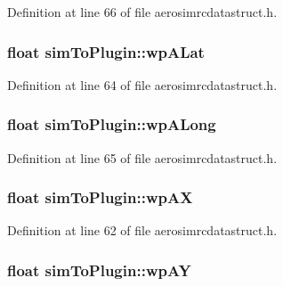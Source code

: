 \-Definition at line 66 of file aerosimrcdatastruct.\-h.

\hypertarget{group___aero_sim_r_c_ga1eb50174e2e2f438f0b1aef4dca0744f}{
\subsubsection[{wp\-A\-Lat}]{\setlength{\rightskip}{0pt plus 5cm}float {\bf sim\-To\-Plugin\-::wp\-A\-Lat}}}\label{group___aero_sim_r_c_ga1eb50174e2e2f438f0b1aef4dca0744f}


\-Definition at line 64 of file aerosimrcdatastruct.\-h.

\hypertarget{group___aero_sim_r_c_gacda15282e441109ecba7a4709e9b8a0c}{
\subsubsection[{wp\-A\-Long}]{\setlength{\rightskip}{0pt plus 5cm}float {\bf sim\-To\-Plugin\-::wp\-A\-Long}}}\label{group___aero_sim_r_c_gacda15282e441109ecba7a4709e9b8a0c}


\-Definition at line 65 of file aerosimrcdatastruct.\-h.

\hypertarget{group___aero_sim_r_c_gaeee88b74290e9df5d3c70d111c9375cc}{
\subsubsection[{wp\-A\-X}]{\setlength{\rightskip}{0pt plus 5cm}float {\bf sim\-To\-Plugin\-::wp\-A\-X}}}\label{group___aero_sim_r_c_gaeee88b74290e9df5d3c70d111c9375cc}


\-Definition at line 62 of file aerosimrcdatastruct.\-h.

\hypertarget{group___aero_sim_r_c_gaf5e140b64d5e9eae533fd3c0195c0fa8}{
\subsubsection[{wp\-A\-Y}]{\setlength{\rightskip}{0pt plus 5cm}float {\bf sim\-To\-Plugin\-::wp\-A\-Y}}}\label{group___aero_sim_r_c_gaf5e140b64d5e9eae533fd3c0195c0fa8}


